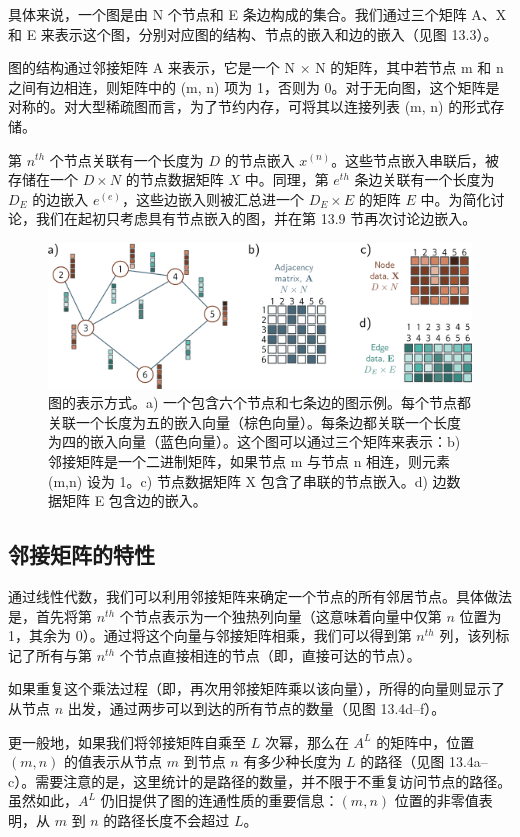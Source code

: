 具体来说，一个图是由 N 个节点和 E 条边构成的集合。我们通过三个矩阵 A、X 和 E 来表示这个图，分别对应图的结构、节点的嵌入和边的嵌入（见图 13.3）。

图的结构通过邻接矩阵 A 来表示，它是一个 N × N 的矩阵，其中若节点 m 和 n 之间有边相连，则矩阵中的 (m, n) 项为 1，否则为 0。对于无向图，这个矩阵是对称的。对大型稀疏图而言，为了节约内存，可将其以连接列表 (m, n) 的形式存储。

第 \(n^{th}\) 个节点关联有一个长度为 \(D\) 的节点嵌入 \(x^{(n)}\)。这些节点嵌入串联后，被存储在一个 \(D \times N\) 的节点数据矩阵 \(X\) 中。同理，第 \(e^{th}\) 条边关联有一个长度为 \(D_E\) 的边嵌入 \(e^{(e)}\)，这些边嵌入则被汇总进一个 \(D_E \times E\) 的矩阵 \(E\) 中。为简化讨论，我们在起初只考虑具有节点嵌入的图，并在第 13.9 节再次讨论边嵌入。

\begin{figure}[ht!]
\centering
\includegraphics[width=0.7\linewidth]{png/chapter13/GraphNodeEdgeAdjacency.png}
\caption{图的表示方式。a) 一个包含六个节点和七条边的图示例。每个节点都关联一个长度为五的嵌入向量（棕色向量）。每条边都关联一个长度为四的嵌入向量（蓝色向量）。这个图可以通过三个矩阵来表示：b) 邻接矩阵是一个二进制矩阵，如果节点 m 与节点 n 相连，则元素 (m,n) 设为 1。c) 节点数据矩阵 X 包含了串联的节点嵌入。d) 边数据矩阵 E 包含边的嵌入。}
\end{figure}


\subsection{邻接矩阵的特性}
通过线性代数，我们可以利用邻接矩阵来确定一个节点的所有邻居节点。具体做法是，首先将第 \(n^{th}\) 个节点表示为一个独热列向量（这意味着向量中仅第 \(n\) 位置为 1，其余为 0）。通过将这个向量与邻接矩阵相乘，我们可以得到第 \(n^{th}\) 列，该列标记了所有与第 \(n^{th}\) 个节点直接相连的节点（即，直接可达的节点）。

如果重复这个乘法过程（即，再次用邻接矩阵乘以该向量），所得的向量则显示了从节点 \(n\) 出发，通过两步可以到达的所有节点的数量（见图 13.4d–f）。

更一般地，如果我们将邻接矩阵自乘至 \(L\) 次幂，那么在 \(A^L\) 的矩阵中，位置 \((m, n)\) 的值表示从节点 \(m\) 到节点 \(n\) 有多少种长度为 \(L\) 的路径（见图 13.4a–c）。需要注意的是，这里统计的是路径的数量，并不限于不重复访问节点的路径。虽然如此，\(A^L\) 仍旧提供了图的连通性质的重要信息：\((m, n)\) 位置的非零值表明，从 \(m\) 到 \(n\) 的路径长度不会超过 \(L\)。

